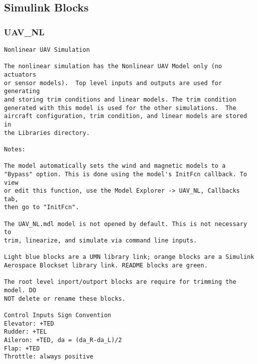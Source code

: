 \documentclass[12pt]{article}
\begin{document}
\subsection{Simulink Blocks}
\subsubsection{UAV\_NL}
\begin{verbatim}
Nonlinear UAV Simulation

The nonlinear simulation has the Nonlinear UAV Model only (no actuators
or sensor models).  Top level inputs and outputs are used for generating
and storing trim conditions and linear models. The trim condition
generated with this model is used for the other simulations.  The
aircraft configuration, trim condition, and linear models are stored in
the Libraries directory. 

Notes:

The model automatically sets the wind and magnetic models to a 
"Bypass" option. This is done using the model's InitFcn callback. To view
or edit this function, use the Model Explorer -> UAV_NL, Callbacks tab, 
then go to "InitFcn".

The UAV_NL.mdl model is not opened by default. This is not necessary to 
trim, linearize, and simulate via command line inputs.

Light blue blocks are a UMN library link; orange blocks are a Simulink
Aerospace Blockset library link. README blocks are green.

The root level inport/outport blocks are require for trimming the model. DO
NOT delete or rename these blocks.

Control Inputs Sign Convention
Elevator: +TED
Rudder: +TEL
Aileron: +TED, da = (da_R-da_L)/2
Flap: +TED
Throttle: always positive

\end{verbatim}
\end{document}
